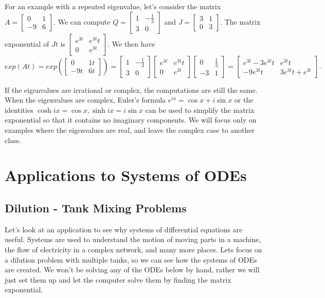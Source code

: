 \documentclass[10pt]{article}
\theoremstyle{plain}
\theoremstyle{box}
\begin{document}
For an example with a repeated eigenvalue, let's consider the matrix 
$A=
\begin{bmatrix}
 0 & 1 \\
 -9 & 6
\end{bmatrix}
$.  We can compute 
$Q=
\begin{bmatrix}
 1 & -\frac{1}{3} \\
 3 & 0
\end{bmatrix}
$
and
$J=
\begin{bmatrix}
 3 & 1 \\
 0 & 3
\end{bmatrix}
$. The matrix exponential of $Jt$ is 
$
\begin{bmatrix}
 e^{3 t} & e^{3 t} t \\
 0 & e^{3 t}
\end{bmatrix}
$. We then have
$$exp\left(A t\right) = exp\left(
\begin{bmatrix}
 0 & 1t \\
 -9t & 6t
\end{bmatrix}
\right)
=
\begin{bmatrix}
 1 & -\frac{1}{3} \\
 3 & 0
\end{bmatrix}
\begin{bmatrix}
 e^{3 t} & e^{3 t} t \\
 0 & e^{3 t}
\end{bmatrix}
\begin{bmatrix}
 0 & \frac{1}{3} \\
 -3 & 1
\end{bmatrix}
=
\begin{bmatrix}
 e^{3 t}-3 e^{3 t} t & e^{3 t} t \\
 -9 e^{3 t} t & 3 e^{3 t} t+e^{3 t}
\end{bmatrix}
.
$$

If the eigenvalues are irrational or complex, the computations are still the same. When the eigenvalues are complex, Euler's formula $e^{ix}=\cos x+i\sin x$ or the identities $\cosh ix = \cos x, \sinh ix = i\sin x$ can be used to simplify the matrix exponential so that it contains no imaginary components. We will focus only on examples where the eigenvalues are real, and leave the complex case to another class.


\section{Applications to Systems of ODEs}
\subsection{Dilution - Tank Mixing Problems}
Let's look at an application to see why systems of differential equations are useful. Systems are used to understand the motion of moving parts in a machine, the flow of electricity in a complex network, and many more places. Lets focus on a dilution problem with multiple tanks, so we can see how the systems of ODEs are created. We won't be solving any of the ODEs below by hand, rather we will just set them up and let the computer solve them by finding the matrix exponential.
\end{document}
